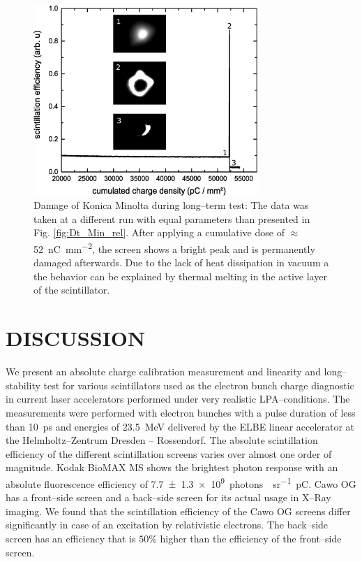 \documentclass[%
preprint,
amsmath,
amssymb,
aip,
rsi, 
numerical,
floatfix,
]{revtex4-1}
\begin{document}
\begin{figure}
\includegraphics[width=8.5cm]{./Figures/Damage}%
\caption{\label{fig:Damage} Damage of Konica Minolta during long--term test: 
The data was taken at a different run with equal parameters than presented in Fig. \ref{fig:Dt_Min_rel}. 
After applying a cumulative dose of $\approx$ \SI[per-mode=symbol]{52}{\nano \coulomb \per \square \milli \meter}, the screen shows a bright peak and is permanently damaged afterwards. 
Due to the lack of heat dissipation in vacuum a the behavior can be explained by thermal melting in the active layer of the scintillator.}
\end{figure}

\section{\label{Cn} DISCUSSION}
We present an absolute charge calibration measurement and linearity and long--stability test for various scintillators used as the electron bunch charge diagnostic in current laser accelerators performed under very realistic LPA--conditions.
The measurements were performed with electron bunches with a pulse duration of less than \SI{10}{\pico\second} and energies of \SI{23.5}{\mega\electronvolt} delivered by the ELBE linear accelerator at the Helmholtz--Zentrum Dresden -- Rossendorf.
The absolute scintillation efficiency of the different scintillation screens varies over almost one order of magnitude.
Kodak BioMAX MS shows the brightest photon response with an absolute fluorescence efficiency of \SI[separate-uncertainty = true]{7.7(13)e9}{photons \per \per \steradian \pico \coulomb}.  
Cawo OG has a front--side screen and a back--side screen for its actual usage in X--Ray imaging. 
We found that the scintillation efficiency of the Cawo OG screens differ significantly in case of an excitation by relativistic electrons.
The back--side screen has an efficiency that is $50\%$ higher than the efficiency of the front--side screen.
 
\end{document}
